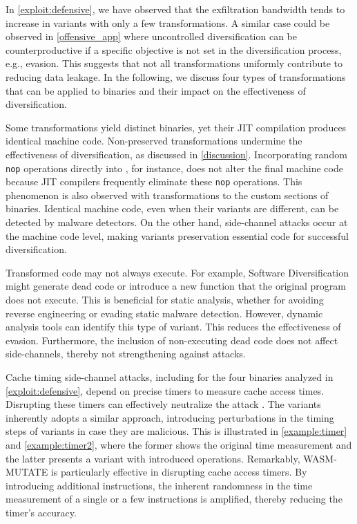 \label{exploit:discussion}

In \autoref{exploit:defensive}, we have observed that the exfiltration bandwidth tends to increase in variants with only a few transformations. 
A similar case could be observed in \autoref{offensive_app} where uncontrolled diversification can be counterproductive if a specific objective is not set in the diversification process, e.g., evasion.
This suggests that not all transformations uniformly contribute to reducing data leakage. 
In the following, we discuss four types of transformations that can be applied to \wasm binaries and their impact on the effectiveness of diversification.

Some transformations yield distinct \wasm binaries, yet their JIT compilation produces identical machine code.
Non-preserved transformations undermine the effectiveness of diversification, as discussed in \autoref{discussion}.
Incorporating random \texttt{nop} operations directly into \wasm, for instance, does not alter the final machine code because JIT compilers frequently eliminate these \texttt{nop} operations.
This phenomenon is also observed with transformations to the custom sections of \Wasm binaries.
Identical machine code, even when their \wasm variants are different, can be detected by malware detectors.
On the other hand, side-channel attacks occur at the machine code level, making \wasm variants preservation essential code for successful diversification.


Transformed code may not always execute. 
For example, Software Diversification might generate dead code or introduce a new function that the original program does not execute. 
This is beneficial for static analysis, whether for avoiding reverse engineering or evading static malware detection. 
However, dynamic analysis tools can identify this type of variant. 
This reduces the effectiveness of evasion. 
Furthermore, the inclusion of non-executing dead code does not affect side-channels, thereby not strengthening against attacks.
 
\vspace{4mm}
 Cache timing side-channel attacks, including for the four binaries analyzed in \autoref{exploit:defensive}, depend on precise timers to measure cache access times. 
Disrupting these timers can effectively neutralize the attack \cite{JStimers}. 
The \wasm variants inherently adopts a similar approach, introducing perturbations in the timing steps of \wasm variants in case they are malicious. 
This is illustrated in \autoref{example:timer} and \autoref{example:timer2}, where the former shows the original time measurement and the latter presents a variant with introduced operations.
Remarkably, WASM-MUTATE is particularly effective in disrupting cache access timers. 
By introducing additional instructions, the inherent randomness in the time measurement of a single or a few instructions is amplified, thereby reducing the timer's accuracy. 

